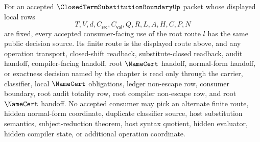 \begin{corollary}
\label{cor:closed-term-substitution-boundary-root-route-l-determinacy}
For an accepted $\ClosedTermSubstitutionBoundaryUp$ packet whose displayed local rows
$$
T,V,d,C_{\mathsf{src}},C_{\mathsf{val}},Q,R,L,A,H,C,P,N
$$
are fixed, every accepted consumer-facing use of the root route $l$ has the same public decision source. Its finite route is the displayed route above, and any operation transport, closed-shift readback, substitute-closed readback, audit handoff, compiler-facing handoff, root $\NameCert$ handoff, normal-form handoff, or exactness decision named by the chapter is read only through the carrier, classifier, local $\NameCert$ obligations, ledger non-escape row, consumer boundary, root audit totality row, root compiler non-escape row, and root $\NameCert$ handoff. No accepted consumer may pick an alternate finite route, hidden normal-form coordinate, duplicate classifier source, host substitution semantics, subject-reduction theorem, host syntax quotient, hidden evaluator, hidden compiler state, or additional operation coordinate.
\end{corollary}
